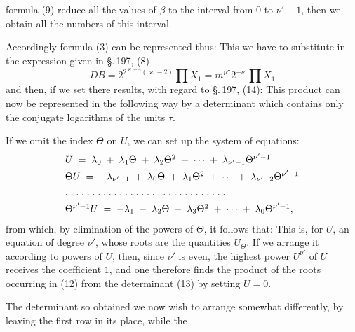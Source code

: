 
formula (9) reduce all the values of $\beta$ to the interval from $0$ to
$\nu' - 1$, then we obtain all the numbers of this interval.

Accordingly formula (3) can be represented thus:
This we have to substitute in the expression given in \S.\,197, (8)
\[
D B = 2^{2^{\varkappa-4}(\varkappa-2)}\prod X_1 = m^{\nu''}2^{-\nu'}\prod X_1
\]
and then, if we set
there results, with regard to \S.\,197, (14):
This product can now be represented in the following way by a
determinant which contains only the conjugate logarithms of the
units $\tau$.

If we omit the index $\Theta$ on $U$, we can set up the system of
equations:
\[
\begin{array}{l}
U \;=\; \lambda_0 \;+\; \lambda_1\Theta \;+\; \lambda_2\Theta^2 \;+\; \cdots \;+\; \lambda_{\nu'-1}\Theta^{\nu'-1} \\[4pt]
\Theta U \;=\; -\lambda_{\nu'-1} \;+\; \lambda_0\Theta \;+\; \lambda_1\Theta^2 \;+\; \cdots \;+\; \lambda_{\nu'-2}\Theta^{\nu'-1} \\[4pt]
\text{\normalfont .\;.\;.\;.\;.\;.\;.\;.\;.\;.\;.\;.\;.\;.\;.\;.\;.\;.\;.\;.\;.\;.\;.\;.\;.\;.\;.\;.\;.\;.} \\[4pt]
\Theta^{\nu'-1} U \;=\; -\lambda_1 \;-\; \lambda_2\Theta \;-\; \lambda_3\Theta^2 \;+\; \cdots \;+\; \lambda_0\Theta^{\nu'-1},
\end{array}
\]
from which, by elimination of the powers of $\Theta$, it follows that:
This is, for $U$, an equation of degree $\nu'$, whose roots are the
quantities $U_\Theta$. If we arrange it according to powers of $U$,
then, since $\nu'$ is even, the highest power $U^{\nu'}$ of $U$ receives
the coefficient $1$, and one therefore finds the product of the roots
occurring in (12) from the determinant (13) by setting $U = 0$.

The determinant so obtained we now wish to arrange somewhat
differently, by leaving the first row in its place, while the
